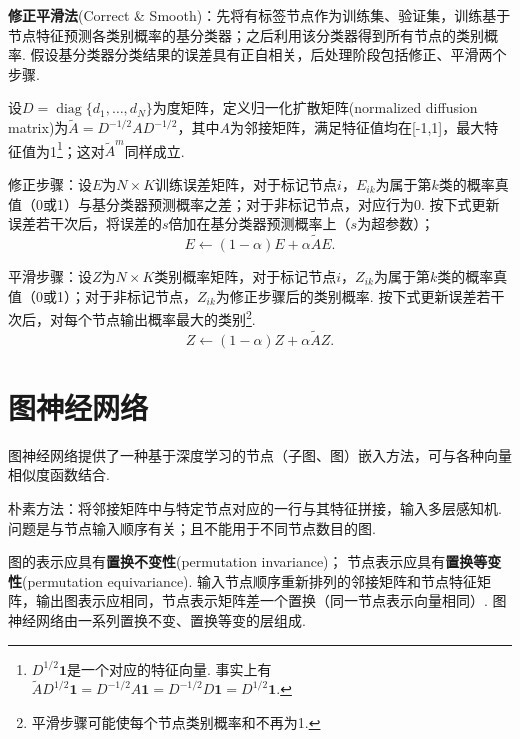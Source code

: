 \par \textbf{修正平滑法}(Correct \& Smooth)：先将有标签节点作为训练集、验证集，训练基于节点特征预测各类别概率的基分类器；之后利用该分类器得到所有节点的类别概率. 假设基分类器分类结果的误差具有正自相关，后处理阶段包括修正、平滑两个步骤. 
\par 设$D=\operatorname{diag}\{d_1,\dots,d_N\}$为度矩阵，定义归一化扩散矩阵(normalized diffusion matrix)为$\tilde{A}=D^{-1/2}AD^{-1/2}$，其中$A$为邻接矩阵，满足特征值均在[-1,1]，最大特征值为1\footnote{$D^{1/2}\mathbf{1}$是一个对应的特征向量. 事实上有$\tilde{A}D^{1/2}\mathbf{1}=D^{-1/2}A\mathbf{1}=D^{-1/2}D\mathbf{1}=D^{1/2}\mathbf{1}$.}；这对$\tilde{A}^m$同样成立. 
\par 修正步骤：设$E$为$N\times K$训练误差矩阵，对于标记节点$i$，$E_{ik}$为属于第$k$类的概率真值（0或1）与基分类器预测概率之差；对于非标记节点，对应行为0. 按下式更新误差若干次后，将误差的$s$倍加在基分类器预测概率上（$s$为超参数）；
\begin{equation}
    E \leftarrow (1-\alpha)E + \alpha \tilde{A}E.
\end{equation}
\par 平滑步骤：设$Z$为$N\times K$类别概率矩阵，对于标记节点$i$，$Z_{ik}$为属于第$k$类的概率真值（0或1）；对于非标记节点，$Z_{ik}$为修正步骤后的类别概率. 按下式更新误差若干次后，对每个节点输出概率最大的类别\footnote{平滑步骤可能使每个节点类别概率和不再为1. }. 
\begin{equation}
    Z \leftarrow (1-\alpha)Z + \alpha \tilde{A}Z.
\end{equation}


\section{图神经网络}

\par 图神经网络提供了一种基于深度学习的节点（子图、图）嵌入方法，可与各种向量相似度函数结合. 

\par 朴素方法：将邻接矩阵中与特定节点对应的一行与其特征拼接，输入多层感知机. 问题是与节点输入顺序有关；且不能用于不同节点数目的图. 

\par 图的表示应具有\textbf{置换不变性}(permutation invariance)； 节点表示应具有\textbf{置换等变性}(permutation equivariance). 输入节点顺序重新排列的邻接矩阵和节点特征矩阵，输出图表示应相同，节点表示矩阵差一个置换（同一节点表示向量相同）. 图神经网络由一系列置换不变、置换等变的层组成. 

